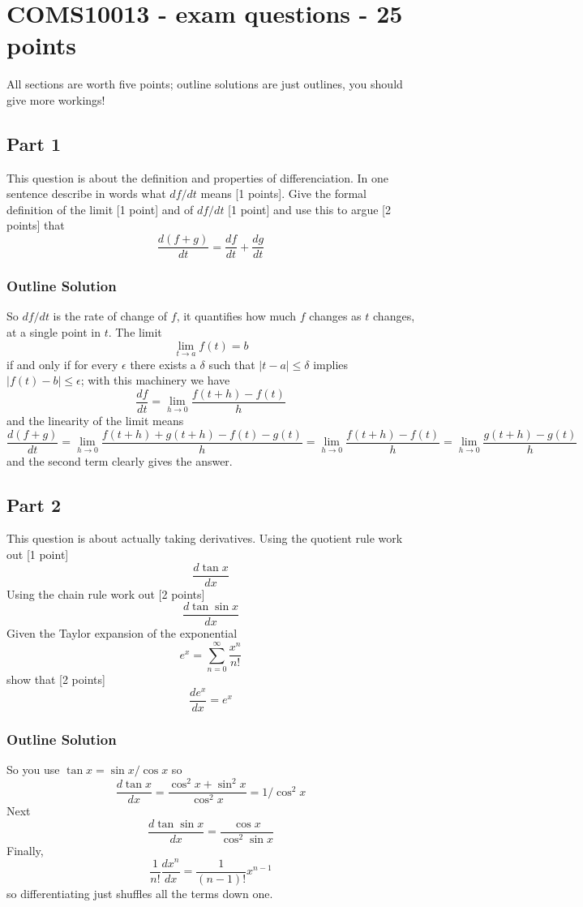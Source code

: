 \documentclass[11pt,a4paper]{scrartcl}
\begin{document}
\section*{COMS10013 - exam questions - 25 points}

All sections are worth five points; outline solutions are just outlines, you should give more workings!

\subsection*{Part 1}
This question is about the definition and properties of differenciation. In one sentence describe in words what $df/dt$ means [1 points]. Give the formal definition of the limit [1 point] and of $df/dt$ [1 point] and use this to argue [2 points] that
    $$
    \frac{d(f+g)}{dt}=\frac{df}{dt}+\frac{dg}{dt}
    $$
  
  \subsubsection*{Outline Solution}
  So $df/dt$ is the rate of change of $f$, it quantifies how much $f$ changes as $t$ changes, at a single point in $t$. The limit
  $$\lim_{t\rightarrow a}f(t)=b$$
  if and only if for every $\epsilon$ there exists a $\delta$ such that $|t-a|\le \delta$ implies $|f(t)-b|\le \epsilon$; with this machinery we have
  $$\frac{df}{dt}=\lim_{h\rightarrow 0}\frac{f(t+h)-f(t)}{h}$$
  and the linearity of the limit means
  $$\frac{d(f+g)}{dt}=\lim_{h\rightarrow 0}\frac{f(t+h)+g(t+h)-f(t)-g(t)}{h}=\lim_{h\rightarrow 0}\frac{f(t+h)-f(t)}{h}=\lim_{h\rightarrow 0}\frac{g(t+h)-g(t)}{h}$$ and the second term clearly gives the answer.

  
  \subsection*{Part 2}
  This question is about actually taking derivatives. Using the quotient rule work out [1 point] 
  $$
    \frac{d\tan{x}}{dx}
    $$
    Using the chain rule work out [2 points]
    $$
    \frac{d\tan{\sin{x}}}{dx}
      $$
      Given the Taylor expansion of the exponential
      $$
      e^x=\sum_{n=0}^\infty \frac{x^n}{n!}
      $$
      show that [2 points]
      $$
      \frac{de^x}{dx}=e^x
      $$
      
    \subsubsection*{Outline Solution}
    So you use $\tan{x}=\sin{x}/\cos{x}$ so
    $$
        \frac{d\tan{x}}{dx}=\frac{\cos^2{x}+\sin^2{x}}{\cos^2{x}}=1/\cos^2{x}
    $$
        Next
 $$
    \frac{d\tan{\sin{x}}}{dx}=\frac{\cos{x}}{\cos^2{\sin{x}}}
      $$
    Finally,
    $$\frac{1}{n!}\frac{dx^n}{dx}=\frac{1}{(n-1)!}x^{n-1}$$
    so differentiating just shuffles all the terms down one.
\end{document}
